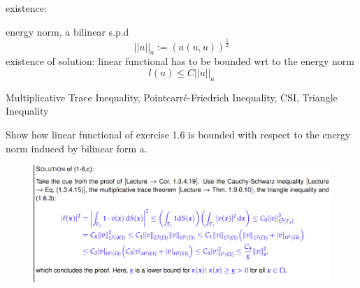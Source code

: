existence:

energy norm, a bilinear s.p.d
$$||u||_a := (a(u,u))^\frac{1}{2}$$
existence of solution: linear functional has to be bounded wrt to the energy norm $$l(u) \leq C||u||_a$$

Multiplicative Trace Inequality, Pointcarré-Friedrich Inequality, CSI, Triangle Inequality

Show how linear functional of exercise 1.6 is bounded with respect to the energy norm induced by bilinear form a.

\begin{figure}
    \centering
    \includegraphics{week02/ex_1_6_c.png}
\end{figure}


